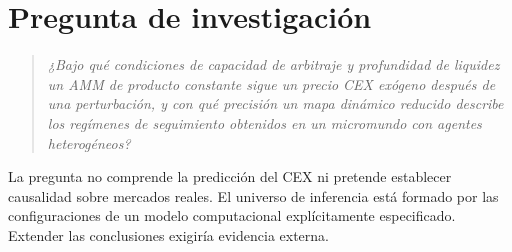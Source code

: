 \section{Pregunta de investigación}

\begin{quote}
\emph{¿Bajo qué condiciones de capacidad de arbitraje y profundidad de liquidez un AMM de producto constante sigue un precio CEX exógeno después de una perturbación, y con qué precisión un mapa dinámico reducido describe los regímenes de seguimiento obtenidos en un micromundo con agentes heterogéneos?}
\end{quote}

La pregunta no comprende la predicción del CEX ni pretende establecer causalidad sobre mercados reales. El universo de inferencia está formado por las configuraciones de un modelo computacional explícitamente especificado. Extender las conclusiones exigiría evidencia externa.
